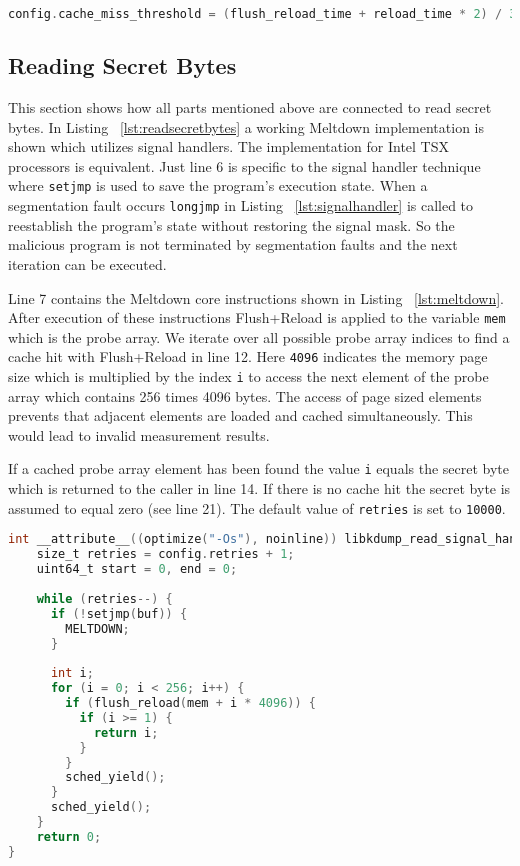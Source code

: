 \documentclass[a4paper,oneside,openright] {scrreprt}
\begin{document}
\begin{lstlisting}[language=C, caption=Meltdown: Cache Miss Threshold 2, label={lst:finalthreshold}]
config.cache_miss_threshold = (flush_reload_time + reload_time * 2) / 3;
\end{lstlisting}

\subsection{Reading Secret Bytes}
\label{ch:intro:motivation:A}

This section shows how all parts mentioned above are connected to read secret bytes.
In Listing ~\ref{lst:readsecretbytes} a working Meltdown implementation is shown which utilizes
signal handlers. The implementation for Intel TSX processors is equivalent.
Just line 6 is specific to the signal handler technique where \texttt{setjmp} is used to save the program's execution state.
When a segmentation fault occurs \texttt{longjmp} in Listing ~\ref{lst:signalhandler} is called to reestablish the program's state
without restoring the signal mask. 
So the malicious program is not terminated by segmentation faults and the next iteration can be executed.

Line 7 contains the Meltdown core instructions shown in Listing ~\ref{lst:meltdown}.
After execution of these instructions Flush+Reload is applied to the variable \texttt{mem} which is the probe array.
We iterate over all possible probe array indices to find a cache hit with Flush+Reload in line 12.
Here \texttt{4096} indicates the memory page size which is multiplied by the index \texttt{i} to access the next element
of the probe array which contains 256 times 4096 bytes. The access of page sized elements prevents that adjacent elements are loaded
and cached simultaneously. This would lead to invalid measurement results.

If a cached probe array element has been found the value \texttt{i} equals the secret byte which is returned to the caller
in line 14. If there is no cache hit the secret byte is assumed to equal zero (see line 21).
The default value of \texttt{retries} is set to \texttt{10000}. 


\begin{lstlisting}[language=C, caption=Meltdown: Reading Secret Bytes, label={lst:readsecretbytes}]
int __attribute__((optimize("-Os"), noinline)) libkdump_read_signal_handler() {
    size_t retries = config.retries + 1;
    uint64_t start = 0, end = 0;
  
    while (retries--) {
      if (!setjmp(buf)) {
        MELTDOWN;
      }
  
      int i;
      for (i = 0; i < 256; i++) {
        if (flush_reload(mem + i * 4096)) {
          if (i >= 1) {
            return i;
          }
        }
        sched_yield();
      }
      sched_yield();
    }
    return 0;
}
\end{lstlisting}
\end{document}
